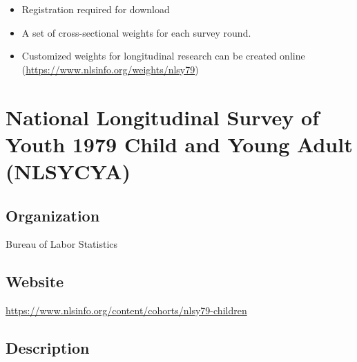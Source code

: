 \documentclass[
]{book}
\providecommand{\tightlist}{%
  \setlength{\itemsep}{0pt}\setlength{\parskip}{0pt}}
\begin{document}
\begin{itemize}
\tightlist
\item
  Registration required for download
\item
  A set of cross-sectional weights for each survey round.
\item
  Customized weights for longitudinal research can be created online (\url{https://www.nlsinfo.org/weights/nlsy79})
\end{itemize}

\mainmatter

\hypertarget{national-longitudinal-survey-of-youth-1979-child-and-young-adult-nlsycya}{%
\chapter{National Longitudinal Survey of Youth 1979 Child and Young Adult (NLSYCYA)}\label{national-longitudinal-survey-of-youth-1979-child-and-young-adult-nlsycya}}

\hypertarget{organization-59}{%
\section{Organization}\label{organization-59}}

Bureau of Labor Statistics

\hypertarget{website-59}{%
\section{Website}\label{website-59}}

\url{https://www.nlsinfo.org/content/cohorts/nlsy79-children}

\hypertarget{description-59}{%
\section{Description}\label{description-59}}
\end{document}
